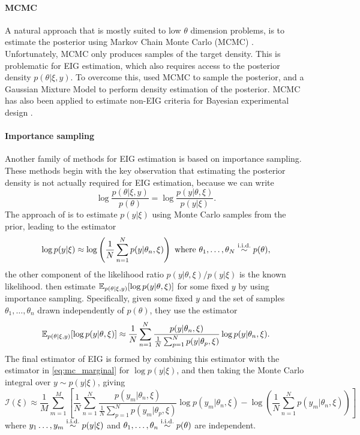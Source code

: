 \documentclass[a4paper, 10pt]{report}
\theoremstyle{plain}
\begin{document}
	\paragraph{MCMC}
	A natural approach that is mostly suited to low $\theta$ dimension problems, is to estimate the posterior using Markov Chain Monte Carlo (MCMC) \citep{andrieu2003introduction}. 
	Unfortunately, MCMC only produces samples of the target density.
	This is problematic for EIG estimation, which also requires access to the posterior density $p(\theta|\xi,y)$.
	To overcome this, \citet{heinrich2020information} used MCMC to sample the posterior, and a Gaussian Mixture Model \citep[Sec.~6.8]{hastie2009elements} to perform density estimation of the posterior.
	MCMC has also been applied to estimate non-EIG criteria for Bayesian experimental design \citep{wakefield1994expected,han2004bayesian}.
	
	\paragraph{Importance sampling} Another family of methods for EIG estimation is based on importance sampling. 
	These methods begin with the key observation that estimating the posterior density is not actually required for EIG estimation, because we can write
	\begin{equation}
	\label{eq:log_ratio}
	\log \frac{p(\theta|\xi,y)}{p(\theta)} = \log \frac{p(y|\theta,\xi)}{p(y|\xi)}.
	\end{equation}
	The approach of \citet{cook2008optimal,ryan2014towards} is to estimate $p(y|\xi)$ using Monte Carlo samples from the prior, leading to the estimator
	\begin{equation}
	\label{eq:mc_marginal}
	\log p(y|\xi) \approx \log \left(\frac{1}{N} \sum_{n=1}^N p(y|\theta_n,\xi)\right) \text{ where }\theta_1,\dots,\theta_N \overset{\scriptstyle{\text{i.i.d.}}}{\sim} p(\theta),
	\end{equation}
	the other component of the likelihood ratio $p(y|\theta,\xi)/p(y|\xi)$ is the known likelihood.
	\citet{cook2008optimal,ryan2014towards} then estimate $\mathbb{E}_{p(\theta|\xi,y)}[\log p(y|\theta,\xi)]$ for some fixed $y$ by using importance sampling.
	Specifically, given some fixed $y$ and the set of samples $\theta_1,\dots,\theta_n$ drawn independently of $p(\theta)$, they use the estimator
	\begin{equation}
	\mathbb{E}_{p(\theta|\xi,y)}[\log p(y|\theta,\xi)] \approx \frac{1}{N}\sum_{n=1}^N \frac{p(y|\theta_n,\xi)}{\frac{1}{N} \sum_{p=1}^N p(y|\theta_p,\xi)} \log p(y|\theta_n,\xi).
	\end{equation}
	The final estimator of EIG is formed by combining this estimator with the estimator in \eqref{eq:mc_marginal} for $\log p(y|\xi)$, 
	and then taking the Monte Carlo integral over $y\sim p(y|\xi)$, giving
	\begin{equation}
	\mathcal{I}(\xi) \approx \frac{1}{M} \sum_{m=1}^M \left[ \frac{1}{N}\sum_{n=1}^N \frac{p(y_m|\theta_n,\xi)}{\frac{1}{N} \sum_{p=1}^N p(y_m|\theta_p,\xi)} \log p(y_m|\theta_n,\xi) - \log \left(\frac{1}{N} \sum_{n=1}^N p(y_m|\theta_n,\xi)\right)\right]
	\end{equation}
	where $y_1\dots,y_m\overset{\scriptstyle{\text{i.i.d.}}}{\sim} p(y|\xi)$ and $\theta_1,\dots,\theta_n \overset{\scriptstyle{\text{i.i.d.}}}{\sim} p(\theta)$ are independent.
	
\end{document}
